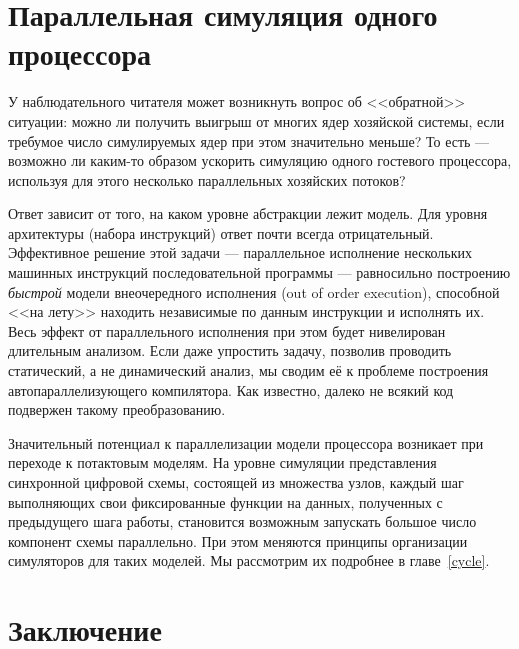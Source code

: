% 
% 


\section{Параллельная симуляция одного процессора}

У наблюдательного читателя может возникнуть вопрос об <<обратной>> ситуации: можно ли получить выигрыш от многих ядер хозяйской системы, если требумое число симулируемых ядер при этом значительно меньше?  То есть --- возможно ли каким-то образом ускорить симуляцию одного гостевого процессора, используя для этого несколько параллельных хозяйских потоков? 

Ответ зависит от того, на каком уровне абстракции лежит модель. Для уровня архитектуры (набора инструкций) ответ почти всегда отрицательный. Эффективное решение этой задачи --- параллельное исполнение нескольких машинных инструкций последовательной программы --- равносильно построению \textit{быстрой} модели внеочередного исполнения (\abbr out of order execution), способной <<на лету>> находить независимые по данным инструкции и исполнять их. Весь эффект от параллельного исполнения при этом будет нивелирован длительным анализом. Если даже упростить задачу, позволив проводить статический, а не динамический анализ, мы сводим её к проблеме построения автопараллелизующего компилятора. Как известно, далеко не всякий код подвержен такому преобразованию.

Значительный потенциал к параллелизации модели процессора возникает при переходе к потактовым моделям. На уровне симуляции представления синхронной цифровой схемы, состоящей из множества узлов, каждый шаг выполняющих свои фиксированные функции на данных, полученных с предыдущего шага работы, становится возможным запускать большое число компонент схемы параллельно. При этом меняются принципы организации симуляторов для таких моделей. Мы рассмотрим их подробнее в главе~\ref{cycle}.

\section{Заключение}

